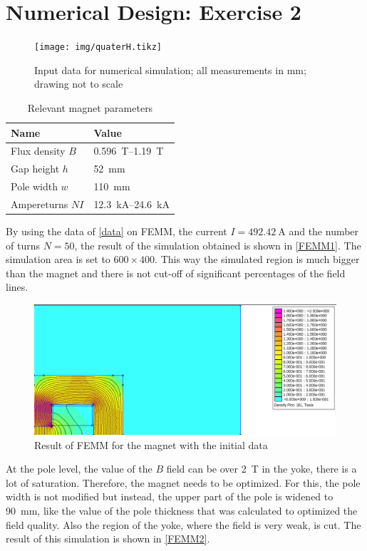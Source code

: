 \documentclass[10pt,a4paper,noendnumber=true]{scrartcl}
\begin{document}
\newpage
\section{\textbf{Numerical Design: Exercise 2}}

\begin{figure}[H]
\centering
\texttt{[image: img/quaterH.tikz]}
\caption{Input data for numerical simulation; all measurements in \si{\mm}; drawing not to scale}
\label{data}
\end{figure}

\begin{table}[H]
\centering
\caption{Relevant magnet parameters}
\begin{tabular}{ll}
\toprule
Name & Value \\
\midrule
Flux density $B$ & \SIrange{0.596}{1.19}{\tesla}\\
Gap height $h$ & \SI{52}{\mm}\\
Pole width $w$ & \SI{110}{\mm}\\
Ampereturns $NI$ & \SIrange{12.3}{24.6}{\kilo\ampere}\\
\bottomrule
\end{tabular}
\end{table}
By using the data of \autoref{data} on FEMM, the current $I = \SI{492.42}{\ampere}$ and the number of turns $N = 50$, the result of the simulation obtained is shown in \autoref{FEMM1}.
The simulation area is set to $600 \times 400$. This way the simulated region is much bigger than the magnet and there is not cut-off of significant percentages of the field lines.

\begin{figure}[H]
    \centering
\includegraphics[width=1 \textwidth]{magnet_non_OP.png} 
\caption{Result of FEMM for the magnet with the initial data}
\label{FEMM1}
\end{figure} 

At the pole level, the value of the $B$ field can be over \SI{2}{\tesla} in the yoke, there is a lot of saturation. Therefore, the magnet needs to be optimized.
For this, the pole width is not modified but instead, the upper part of the pole is widened to \SI{90}{\mm}, like the value of the pole thickness that was calculated to optimized the field quality. Also the region of the yoke, where the field is very weak, is cut. The result of this simulation is shown in \autoref{FEMM2}.
\end{document}
